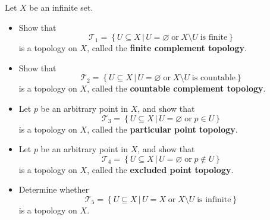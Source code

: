 \documentclass[12pt]{article}
\newenvironment{problem}[2][Problem]{\begin{trivlist}
\item[\hskip \labelsep {\bfseries #1}\hskip \labelsep {\bfseries #2.}]}{\end{trivlist}}
\begin{document}
\begin{problem}{2-1}
	Let $X$ be an infinite set.
	\begin{itemize}
		\item Show that $$\mathcal{T}_1 = \left\{ U\subseteq X \, | \, U=\varnothing \; \text{or} \; X\setminus U \; \text{is finite}\right\} $$ is a topology on $X$, called the \textbf{finite complement topology}.
		\item Show that $$\mathcal{T}_2 = \left\{ U\subseteq X \, | \, U=\varnothing \; \text{or} \; X\setminus U \; \text{is countable}\right\} $$ is a topology on $X$, called the \textbf{countable complement topology}.
		\item Let $p$ be an arbitrary point in $X$, and show that $$\mathcal{T}_3 = \left\{ U\subseteq X \, | \, U=\varnothing \; \text{or} \; p\in U \right\} $$ is a topology on $X$, called the \textbf{particular point topology}.
		\item Let $p$ be an arbitrary point in $X$, and show that $$\mathcal{T}_4 = \left\{ U\subseteq X \, | \, U=\varnothing \; \text{or} \; p\notin U \right\} $$ is a topology on $X$, called the \textbf{excluded point topology}.
		\item Determine whether $$\mathcal{T}_5 = \left\{ U\subseteq X \, | \, U=X \; \text{or} \; X\setminus U \; \text{is infinite} \right\} $$ is a topology on $X$.
	\end{itemize}
\end{problem}
\end{document}
